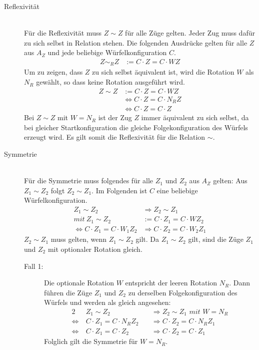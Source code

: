\documentclass[12pt,a4paper, usenames, dvipsnames]{article}
\theoremstyle{mystyle}
\theoremstyle{definition}
\begin{document}
\begin{description}


\item [Reflexivität] \ \\
Für die Reflexivität muss $Z \sim Z$ für alle Züge gelten. Jeder Zug muss dafür zu sich selbst in Relation stehen. Die folgenden Ausdrücke gelten für alle $Z$ aus $A_Z$ und jede beliebige Würfelkonfiguration $C$.
\begin{align*}
Z \sim_R Z & := C \cdot Z = C \cdot WZ
\end{align*}
Um zu zeigen, dass $Z$ zu sich selbst äquivalent ist, wird die Rotation $W$ als $N_R$ gewählt, so dass keine Rotation ausgeführt wird.
\begin{align*}
Z \sim Z  & := C \cdot Z = C \cdot WZ \\
\ & \Leftrightarrow C \cdot Z=C \cdot N_R Z \\
\ & \Leftrightarrow C \cdot Z = C \cdot Z
\end{align*}
Bei $Z \sim Z$ mit $W=N_R$ ist der Zug $Z$ immer äquivalent zu sich selbst, da bei gleicher Startkonfiguration die gleiche Folgekonfiguration des Würfels erzeugt wird. Es gilt somit die Reflexivität für die Relation $\sim$.

\item [Symmetrie] \ \\
Für die Symmetrie muss folgendes für alle $Z_1$ und $Z_2$ aus $A_Z$ gelten: Aus $Z_1 \sim Z_2$ folgt $Z_2 \sim Z_1$.  Im Folgenden ist $C$ eine beliebige Würfelkonfiguration.
\begin{align*}
Z_1 \sim Z_2 & \Rightarrow Z_2 \sim Z_1 \\
mit \ Z_1 \sim Z_2  & :=  C \cdot  Z_1 = C \cdot  WZ_2 \\
\Leftrightarrow C \cdot  Z_1 = C \cdot  W_1 Z_2 & \Rightarrow C \cdot  Z_2 = C \cdot  W_2 Z_1
\end{align*}
$Z_2 \sim Z_1$ muss gelten, wenn $Z_1 \sim Z_2$ gilt. Da $Z_1 \sim Z_2$ gilt, sind die Züge $Z_1$ und $Z_2$ mit optionaler Rotation gleich. 
\begin{description}

\item[Fall 1:] 
Die optionale Rotation $W$ entspricht der leeren Rotation $N_R$. Dann führen die Züge $Z_1$ und $Z_2$ zu derselben Folgekonfiguration des Würfels und werden als gleich angesehen:
\begin{alignat*}{2}
& Z_1 \sim Z_2 && \Rightarrow Z_2 \sim Z_1 \textit{ mit }  W = N_R \\ 
\Leftrightarrow \  & C \cdot  Z_1 = C \cdot  N_R Z_2 \ && \Rightarrow C \cdot  Z_2 = C \cdot  N_R Z_1 \\
\Leftrightarrow \  & C \cdot  Z_1 = C \cdot  Z_2 && \Rightarrow C \cdot  Z_2 = C \cdot  Z_1 
\end{alignat*}
Folglich gilt die Symmetrie für $W = N_R$.


\end{description}
\end{description}
\end{document}
